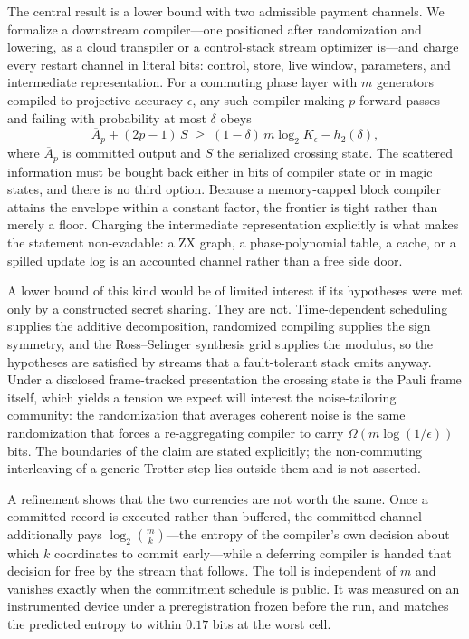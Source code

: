 \documentclass[11pt]{article}
\begin{document}
The central result is a lower bound with two admissible payment channels. We
formalize a downstream compiler---one positioned after randomization and
lowering, as a cloud transpiler or a control-stack stream optimizer is---and
charge every restart channel in literal bits: control, store, live window,
parameters, and intermediate representation. For a commuting phase layer with
$m$ generators compiled to projective accuracy $\epsilon$, any such compiler
making $p$ forward passes and failing with probability at most $\delta$ obeys
\begin{equation*}
  \overline{A}_p + (2p-1)\,S \;\ge\; (1-\delta)\,m \log_2 K_\epsilon - h_2(\delta),
\end{equation*}
where $\overline{A}_p$ is committed output and $S$ the serialized crossing
state. The scattered information must be bought back either in bits of compiler
state or in magic states, and there is no third option. Because a memory-capped
block compiler attains the envelope within a constant factor, the frontier is
tight rather than merely a floor. Charging the intermediate representation
explicitly is what makes the statement non-evadable: a ZX graph, a
phase-polynomial table, a cache, or a spilled update log is an accounted
channel rather than a free side door.

A lower bound of this kind would be of limited interest if its hypotheses were
met only by a constructed secret sharing. They are not. Time-dependent
scheduling supplies the additive decomposition, randomized compiling supplies
the sign symmetry, and the Ross--Selinger synthesis grid supplies the modulus,
so the hypotheses are satisfied by streams that a fault-tolerant stack emits
anyway. Under a disclosed frame-tracked presentation the crossing state is the
Pauli frame itself, which yields a tension we expect will interest the
noise-tailoring community: the randomization that averages coherent noise is
the same randomization that forces a re-aggregating compiler to carry
$\Omega(m \log(1/\epsilon))$ bits. The boundaries of the claim are stated
explicitly; the non-commuting interleaving of a generic Trotter step lies
outside them and is not asserted.

A refinement shows that the two currencies are not worth the same. Once a
committed record is executed rather than buffered, the committed channel
additionally pays $\log_2\binom{m}{k}$---the entropy of the compiler's own
decision about which $k$ coordinates to commit early---while a deferring
compiler is handed that decision for free by the stream that follows. The toll
is independent of $m$ and vanishes exactly when the commitment schedule is
public. It was measured on an instrumented device under a preregistration
frozen before the run, and matches the predicted entropy to within $0.17$ bits
at the worst cell.
\end{document}
